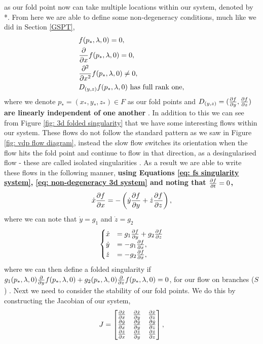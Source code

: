 as our fold point now can take multiple locations within our system, denoted by *. From here we are able to define some non-degeneracy conditions, much like we did in Section \ref{GSPT},
\begin{equation}
\begin{aligned}
&f(p_*,\lambda,0)=0,\\
&\pd{}{x}f(p_*,\lambda,0)=0,\\
&\pd{^2}{x^2}f(p_*,\lambda,0)\neq 0,\\
&D_{(y,z)}f(p_*,\lambda,0) \ \text{has full rank one},
\end{aligned}
\label{eq: non-degeneracy 3d system}	
\end{equation}
where we denote $ p_*=(x_*,y_*,z_*)\in F $ as our fold points and\textbf{ $ D_{(y,z)}=(\pd{f}{y},\pd{f}{z}) $ are linearly independent of one another } \citep{MMO}. In addition to this we can see from Figure \ref{fig: 3d folded singularity} that we have some interesting flows within our system. These flows do not follow the standard pattern as we saw in Figure \ref{fig: vdp flow diagram}, instead the slow flow switches its orientation when the flow hits the fold point and continue to flow in that direction, as a desingularised flow - these are called isolated singularities \citep{MMO}. %
As a result we are able to write these flows in the following manner, \textbf{using Equations \ref{eq: fs singularity system}, \ref{eq: non-degeneracy 3d system} and noting that $ \pd{f}{t}=0 $,  }
\begin{equation}
\dot{x}\pd{f}{x}=-\left(\dot{y}\pd{f}{y}+\dot{z}\pd{f}{z}\right),
\end{equation}
where we can note that $ \dot{y}=g_1 $ and $ \dot{z}=g_2 $\\
\begin{equation}
\begin{cases}
\dot{x}&=g_1\pd{f}{y}+g_2\pd{f}{z}\\
\dot{y}&=-g_1\pd{f}{x},\\
\dot{z}&=-g_2\pd{f}{x},
\end{cases}
\end{equation}
where we can then define a folded singularity if $ g_1(p_*,\lambda,0)\pd{}{y}f(p_*,\lambda,0)+g_2(p_*,\lambda,0)\pd{}{z}f(p_*,\lambda,0)=0 $, for our flow on branches ($ S $) \citep{MMO}. Next we need to consider the stability of our fold points. We do this by constructing the Jacobian of our system, 
\begin{equation}
J=\begin{bmatrix}
\pd{\dot{x}}{x}&\pd{\dot{x}}{y}&\pd{\dot{x}}{z}\\
\pd{\dot{y}}{x}&\pd{\dot{y}}{y}&\pd{\dot{y}}{z}\\
\pd{\dot{z}}{x}&\pd{\dot{z}}{y}&\pd{\dot{z}}{z}\\
\end{bmatrix},
\end{equation}

